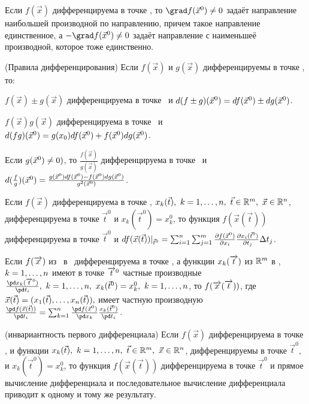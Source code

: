 \documentclass[a4paper]{article}
\newcommand{\билет}[1]{\par\medskip\noindent{\large \textsf{Билет #1.}}\par}
\begin{document}
\begin{theorem} Если $f(\vec x)$ дифференцируема в точке , то $\grad f(\vxx)\ne0$ задаёт направление наибольшей производной по направлению, причем такое направление единственное, а $-\grad f(\vxx)\ne 0$ задаёт направление  с наименьшеё производной, которое тоже единственно.
\end{theorem}

\hspace{-5mm} (Правила дифференцирования) Если $f(\vec x)$ и $g(\vec x)$ дифференцируемы в точке , то:

 $f(\vec x)\pm g(\vec x)$ дифференцируема в точке \ и $d(f\pm g)(\vec x^0)=df(\vec x^0)\pm dg(\vec x^0)$.

 $f(\vec x) g(\vec x)$ дифференцируема в точке \ и $d(fg)(\vec x^0)=g(x_0)df(\vec x^0)+f(\vec x^0)dg(\vec x^0)$.

 Если $g(\vec x^0)\ne0)$, то $\frac{f(\vec x)}{g(\vec x)}$ дифференцируема в точке \ и
$d(\frac{f}{g})(\vec x^0)=\frac{g(\vec x^0)df(\vec x^0)-f(\vec x^0)dg(\vec x^0)}{g^2(\vec x^0)}$.

 Если $f(\vec x)$ дифференцируема в точке , $x_k(\vec t),\ k=1,\bnl,n,\ \vec t\in \hh^m,\ \vec
x\in\hy$, дифференцируема в точке $\vec t^0$ и $x_k(\vec t^0)=x_k^0$, то функция $f(\vec x(\vec t))$
дифференцируема в точке $\vec t^0$ и $df(\vec x(\vec t))|_{\vec t^0}=\sum_{i=1}^n\sum_{j=1}^m
\frac{\partial f(\vec x^0)}{\partial x_i}\frac{\partial x_i(\vec t^0)}{\partial t_j}\Delta t_j$.

\begin{imp}
Если $f(\overrightarrow x)$ из \ в \ дифференцируема в точке , а функции $x_k(\overrightarrow t)$ из $\mathbb R^m$ в ,
$k=1,\ldots,n$ имеют в точке $\overrightarrow t^0$ частные производные  $\frac{\pd x_k(\drn t^0)}{\pd t_i},\ k=1,\bnl,n,\
x_k(\vec t^0)=x_k^0,\ k=1,\bnl,n$, то $f(\overrightarrow x(\overrightarrow t))$, где $\vec x (\vec t)=(x_1(\vec t),\ldots,x_n(\vec
t)),$ имеет частную производную $\frac{\pd f(\vec x(\vec t))}{\pd t_i}=\summ \frac{\pd f(\vxx)}{\pd
x_k}\frac{x_k(\vec t^0)}{\pd t_i}$.
\end{imp}

\begin{imp}
(инвариантность первого дифференциала) Если $f(\vec x)$ дифференцируема в точке , и функции $x_k(\vec t),\
k=1,\ldots,n,\ \vec t\in \mathbb R^m,\ \vec x\in\mathbb R^n$, дифференцируемы в точке $\vec t^0$, и $x_k(\vec t^0)=x_k^0$, то
функция $f(\vec x(\vec t))$ дифференцируема в точке $\vec t^0$ и прямое вычисление дифференциала и
последовательное вычисление дифференциала приводит к одному и тому же результату.
\end{imp}
\end{document}
